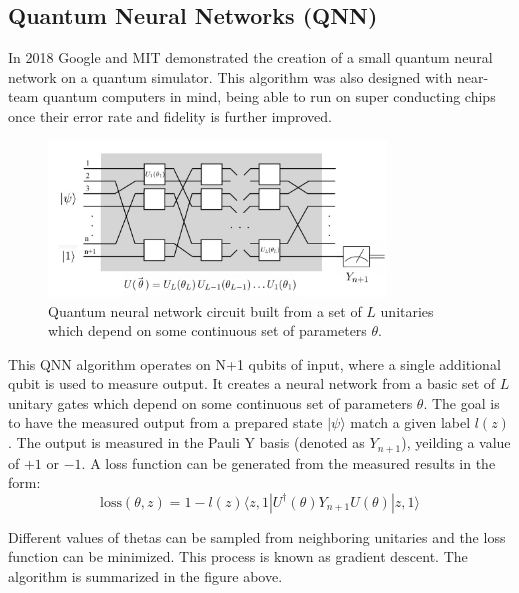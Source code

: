 \documentclass[12pt]{article}
\begin{document}
\subsection*{Quantum Neural Networks (QNN)}
In 2018 Google and MIT demonstrated the creation of a small quantum neural network on a quantum simulator. \cite{farhi2018classification} This algorithm was also designed with near-team quantum computers in mind, being able to run on super conducting chips once their error rate and fidelity is further improved.

\begin{figure}[h]
\centering
\includegraphics[width=0.8\textwidth]{QNN_Algo.png}
\caption{Quantum neural network circuit built from a set of $L$ unitaries which depend on some continuous set of parameters $\theta$.}
\end{figure}

This QNN algorithm operates on N+1 qubits of input, where a single additional qubit is used to measure output. It creates a neural network from a basic set of $L$ unitary gates which depend on some continuous set of parameters $\theta$. The goal is to have the measured output from a prepared state $|\psi\rangle$ match a given label $l(z)$. The output is measured in the Pauli Y basis (denoted as $Y_{n+1}$), yeilding a value of $+1$ or $-1$. A loss function can be generated from the measured results in the form:
\begin{equation}
    \text{loss} (\theta, z) = 1 - l(z) \langle z, 1| U^\dagger(\theta)Y_{n+1} U(\theta) |z, 1\rangle
\end{equation}

Different values of thetas can be sampled from neighboring unitaries and the loss function can be minimized. This process is known as gradient descent. The algorithm is summarized in the figure above.
\end{document}
